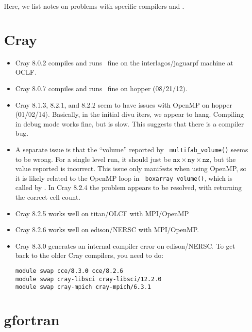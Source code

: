 Here, we list notes on problems with specific compilers and \maestro.


\section{Cray}

\begin{itemize}
\item Cray 8.0.2 compiles and runs \maestro\ fine on the interlagos/jaguarpf 
machine at OCLF.
\item Cray 8.0.7 compiles and runs \maestro\ fine on hopper (08/21/12).

\item Cray 8.1.3, 8.2.1, and 8.2.2 seem to have issues with OpenMP on hopper 
 (01/02/14).  Basically, in the initial divu iters, we appear to hang.
 Compiling in debug mode works fine, but is slow.  This suggests that
 there is a compiler bug.
 
 \item A separate issue is that the ``volume'' reported by {\tt
 multifab\_volume()} seems to be wrong.  For a single level run, it
 should just be $\mathtt{nx} \times \mathtt{ny} \times \mathtt{nz}$,
 but the value reported is incorrect.  This issue only manifests when
 using OpenMP, so it is likely related to the OpenMP loop in {\tt
 boxarray\_volume()}, which is called by .
 In Cray 8.2.4 the problem appears to be resolved, with  
  returning the correct cell count.

\item Cray 8.2.5 works well on titan/OLCF with MPI/OpenMP
\item Cray 8.2.6 works well on edison/NERSC with MPI/OpenMP.

\item Cray 8.3.0 generates an internal compiler error on edison/NERSC.
      To get back to the older Cray compilers, you need to do:
\begin{verbatim}
module swap cce/8.3.0 cce/8.2.6
module swap cray-libsci cray-libsci/12.2.0
module swap cray-mpich cray-mpich/6.3.1
\end{verbatim}

\end{itemize}


\section{gfortran}

